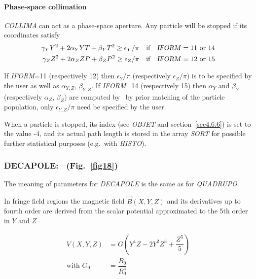 \paragraph{Phase-space collimation}

\noindent \textsl{COLLIMA}  can act as a phase-space aperture. 
Any particle will be stopped if its coordinates satisfy 
\begin{align*}
	\gamma_Y Y^2 + 2\alpha_Y Y T + \beta_Y T^2 \geq  \epsilon_Y/\pi 
	   &   \quad \text{if}\quad  \text{\textsl{IFORM}}=11  \text{ or 14} \\
	\gamma_Z Z^2 + 2\alpha_Z Z P + \beta_Z P^2 \geq  \epsilon_Z/\pi 
	   &   \quad \text{if}\quad  \text{\textsl{IFORM}}=12  \text{ or 15}
\end{align*}

\noindent If \textsl{IFORM}=11 (respectively 12) then $\epsilon_Y/\pi$  (respectively $\epsilon_Z/\pi$) 
is to be specified by the user as well as $\alpha_{Y,Z}$, $\beta_{Y,Z}$. 
If \textsl{IFORM}=14 (respectively 15) then $\alpha_Y$ and  $\beta_Y$  (respectively $\alpha_Z$,  $\beta_Z$) 
are computed by \zgoubi\ by prior 
matching of the particle population, only $\epsilon_{Y,Z}/\pi$ need be specified by the user. 




\bigskip

\noindent When a particle is stopped, its index \IEX{} (see \textsl{OBJET}
and section~\ref{sec4.6.6}) is set to the value -4, and its actual path length is stored in 
the array \textsl{SORT}  for possible further statistical purposes (e.g.~with 
\textsl{HISTO}). 


\newpage

\subsubsection*{DECAPOLE:  \DECAPOLETitl\ (Fig.~\protect\ref{fig18})} \label{DECAPOLE} 
\medskip

The meaning of parameters for \textsl{DECAPOLE}  is the same as for \textsl{QUADRUPO}.  

\noindent In fringe field regions the magnetic field $ \vec  B(X,Y,Z) $ and
its derivatives up to fourth order are derived from the scalar potential approximated to 
the 5th order in $ Y $ and $ Z $ 

\begin{align*}
	V(X,Y,Z) &   =    G \left(Y^4Z-2Y^2Z^3+ \dfrac{Z^5 }{ 5}\right)  \\
	\text{with  } G_0 &   = \dfrac{ B_0 }{ R^4_0} 
\end{align*}


